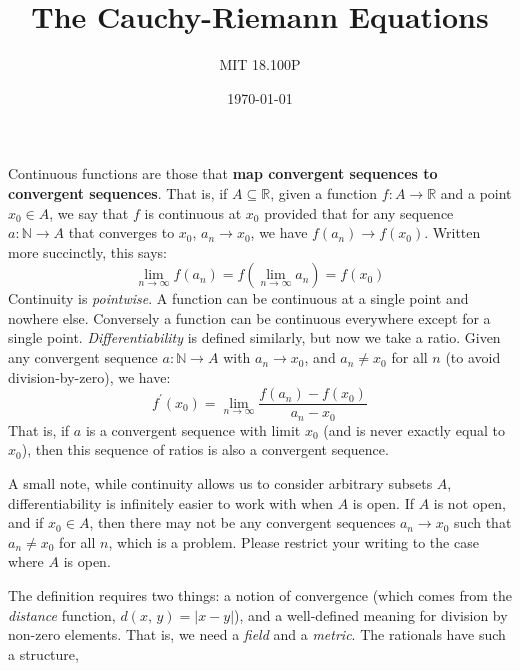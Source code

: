 \documentclass{article}
\title{The Cauchy-Riemann Equations}
\author{MIT 18.100P}
\date{\today}
\begin{document}
    \maketitle
    Continuous functions are those that \textbf{map convergent sequences to}
    \textbf{convergent sequences}. That is, if $A\subseteq\mathbb{R}$, given
    a function $f:A\rightarrow\mathbb{R}$ and a point $x_{0}\in{A}$, we say
    that $f$ is continuous at $x_{0}$ provided that for any sequence
    $a:\mathbb{N}\rightarrow{A}$ that converges to $x_{0}$,
    $a_{n}\rightarrow{x}_{0}$, we have $f(a_{n})\rightarrow{f}(x_{0})$.
    Written more succinctly, this says:
    \begin{equation}
        \lim_{n\rightarrow\infty}f(a_{n})
        =f\left(\lim_{n\rightarrow\infty}a_{n}\right)
        =f(x_{0})
    \end{equation}
    Continuity is \textit{pointwise}. A function can be continuous at a single
    point and nowhere else. Conversely a function can be continuous everywhere
    except for a single point. \textit{Differentiability} is defined similarly,
    but now we take a ratio. Given any convergent sequence
    $a:\mathbb{N}\rightarrow{A}$ with $a_{n}\rightarrow{x}_{0}$, and
    $a_{n}\ne{x}_{0}$ for all $n$ (to avoid division-by-zero), we have:
    \begin{equation}
        f^{\prime}(x_{0})
        =\lim_{n\rightarrow\infty}
        \frac{f(a_{n})-f(x_{0})}{a_{n}-x_{0}}
    \end{equation}
    That is, if $a$ is a convergent sequence with limit $x_{0}$ (and is never
    exactly equal to $x_{0}$), then this sequence of ratios is also a
    convergent sequence.
    \par\hfill\par
    A small note, while continuity allows us to consider arbitrary subsets
    $A$, differentiability is infinitely easier to work with when $A$ is open.
    If $A$ is not open, and if $x_{0}\in{A}$, then there may not be any
    convergent sequences $a_{n}\rightarrow{x}_{0}$ such that $a_{n}\ne{x}_{0}$
    for all $n$, which is a problem. Please restrict your writing to
    the case where $A$ is open.
    \par\hfill\par
    The definition requires two things: a notion of convergence (which comes
    from the \textit{distance} function, $d(x,\,y)=|x-y|$), and a well-defined
    meaning for division by non-zero elements. That is, we need a
    \textit{field} and a \textit{metric}. The rationals have such a structure,
\end{document}
